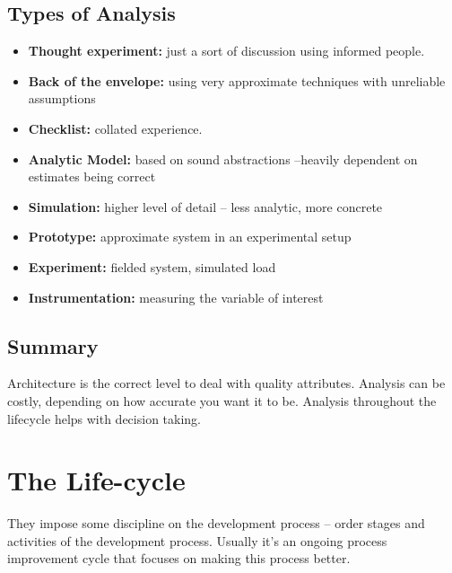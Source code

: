 \documentclass[a4paper]{article}
\begin{document}
\subsection{Types of Analysis}
\begin{itemize}
\item
\textbf{Thought experiment:} just a sort of discussion using informed people. 

\item
\textbf{Back of the envelope:} using very approximate techniques with unreliable assumptions

\item
\textbf{Checklist:} collated experience.

\item
\textbf{Analytic Model:} based on sound abstractions –heavily dependent on estimates being correct

\item
\textbf{Simulation:} higher level of detail – less analytic, more concrete 

\item
\textbf{Prototype:} approximate system in an experimental setup

\item
\textbf{Experiment:} fielded system, simulated load 

\item
\textbf{Instrumentation:} measuring the variable of interest
\end{itemize}

\subsection{Summary}
Architecture is the correct level to deal with quality attributes.
Analysis can be costly, depending on how accurate you want it to be.
Analysis throughout the lifecycle helps with decision taking.

\newpage
\section{The Life-cycle}
They impose some discipline on the development process – order stages and activities of the development process. Usually it's an ongoing process improvement cycle that focuses on making this process better.
\end{document}
